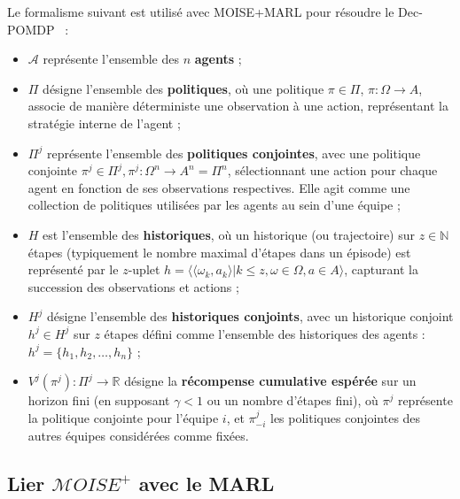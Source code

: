 \documentclass[pdflatex,sn-mathphys-num]{sn-jnl}%
\theoremstyle{thmstyleone}%
\theoremstyle{thmstyletwo}%
\theoremstyle{thmstylethree}%
\begin{document}
Le formalisme suivant est utilisé avec MOISE+MARL pour résoudre le Dec-POMDP~\cite{Beynier2013,Albrecht2024} :
\begin{itemize}
    \item $\mathcal{A}$ représente l'ensemble des $n$ \textbf{agents} ;
    \item $\Pi$ désigne l'ensemble des \textbf{politiques}, où une politique $\pi \in \Pi$, $\pi: \Omega \rightarrow A$, associe de manière déterministe une observation à une action, représentant la stratégie interne de l'agent ;
    \item $\Pi^{j}$ représente l'ensemble des \textbf{politiques conjointes}, avec une politique conjointe $\pi^{j} \in \Pi^{j}, \pi^{j}: \Omega^n \rightarrow A^n = \Pi^n$, sélectionnant une action pour chaque agent en fonction de ses observations respectives. Elle agit comme une collection de politiques utilisées par les agents au sein d'une équipe ;
    \item $H$ est l'ensemble des \textbf{historiques}, où un historique (ou trajectoire) sur $z \in \mathbb{N}$ étapes (typiquement le nombre maximal d'étapes dans un épisode) est représenté par le $z$-uplet $h = \langle \langle \omega_{k}, a_{k}\rangle | k \leq z, \omega \in \Omega, a \in A\rangle$, capturant la succession des observations et actions ;
    \item $H^{j}$ désigne l'ensemble des \textbf{historiques conjoints}, avec un historique conjoint $h^{j} \in H^{j}$ sur $z$ étapes défini comme l'ensemble des historiques des agents : $h^{j} = \{h_1, h_2, \dots, h_n\}$ ;
    \item $V^{j}(\pi^{j}): \Pi^{j} \rightarrow \mathbb{R}$ désigne la \textbf{récompense cumulative espérée} sur un horizon fini (en supposant $\gamma < 1$ ou un nombre d'étapes fini), où $\pi^{j}$ représente la politique conjointe pour l'équipe $i$, et $\pi^{j}_{-i}$ les politiques conjointes des autres équipes considérées comme fixées.
\end{itemize}


\subsection{Lier $\mathcal{M}OISE^+$ avec le MARL}
\end{document}
